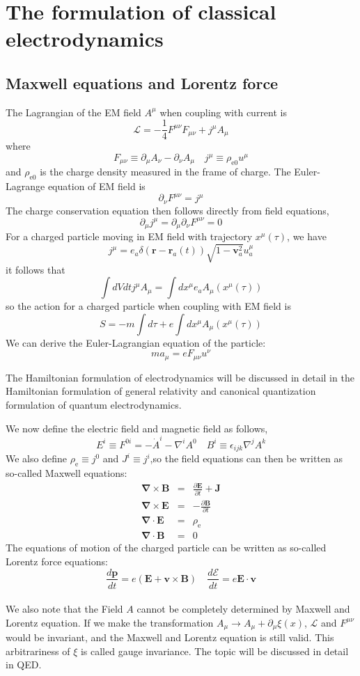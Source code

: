 \section{The formulation of classical electrodynamics}
\subsection{Maxwell equations and Lorentz force}
The Lagrangian of the EM field $A^{\mu}$ when coupling with current is
\[\mathcal{L} = -\frac{1}{4}F^{\mu\nu}F_{\mu\nu} + j^{\mu} A_{\mu}\]
where
\[F_{\mu\nu} \equiv \partial_{\mu}A_{\nu} - \partial_{\nu}A_{\mu} \quad j^{\mu} \equiv \rho_{\mathrm{e}0} u^{\mu}\]
and $\rho_{\mathrm{e}0}$ is the charge density measured in the frame of charge.
The Euler-Lagrange equation of EM field is
\[\partial_{\nu} F^{\mu\nu} = j^{\mu}\]
The charge conservation equation then follows directly from field equations,
\[\partial_{\mu} j^{\mu} = \partial_{\mu} \partial_{\nu} F^{\mu\nu} = 0\]
For a charged particle moving in EM field with trajectory $x^{\mu}(\tau)$, we have
\[j^{\mu} =  e_a \delta(\bm{r}-\bm{r}_a(t)) \sqrt{1-\bm{v}_a^2} u_a^\mu \]
it follows that
\[\int dV dt j^{\mu} A_{\mu} = \int dx^{\mu} e_a A_{\mu}(x^{\mu}(\tau))\]
so the action for a charged particle when coupling with EM field is
\[S = - m \int d\tau + e\int dx^{\mu} A_{\mu}(x^{\mu}(\tau))\]
We can derive the Euler-Lagrangian equation of the particle:
\[ma_{\mu} = eF_{\mu \nu}u^{\nu}\]
\begin{note}
The Hamiltonian formulation of electrodynamics will be discussed in detail in the Hamiltonian formulation of general relativity and canonical quantization formulation of quantum electrodynamics.
\end{note}
\noindent
We now define the electric field and magnetic field as follows,
\[E^i \equiv F^{0i} = -\dot{A}^i - \nabla^i A^0 \quad B^i \equiv \epsilon_{ijk} \nabla^j A^k\]
We also define $\rho_{\mathrm{e}} \equiv j^0$ and $J^i \equiv j^i$,so
the field equations can then be written as so-called Maxwell equations:
\begin{eqnarray}
	\bm{\nabla} \times  \bm{B} &=& \frac{\partial \bm{E}}{\partial t} +  \bm{J} \nonumber \\
	\bm{\nabla} \times \bm{E} &=& -\frac{\partial \bm{B}}{\partial t} \nonumber \\
	\bm{\nabla} \cdot \bm{E} &=& \rho_{\mathrm{e}} \nonumber \\
	\bm{\nabla} \cdot \bm{B} &=& 0 \nonumber
\end{eqnarray}
The equations of motion of the charged particle can be written as so-called Lorentz force equations:
\[\frac{d\bm{p}}{dt} = e(\bm{E} + \bm{v} \times \bm{B}) \quad \frac{d \mathcal{E}}{dt} = e \bm{E} \cdot \bm{v}\]
\\
We also note that the Field $A$ cannot be completely determined by Maxwell and Lorentz equation. If we make the transformation $A_{\mu} \to A_{\mu} + \partial_{\mu} \xi(x)$, $\mathcal{L}$ and $F^{\mu\nu}$ would be invariant, and the Maxwell and Lorentz equation is still valid. This arbitrariness of $\xi$ is called gauge invariance. The topic will be discussed in detail in QED.

